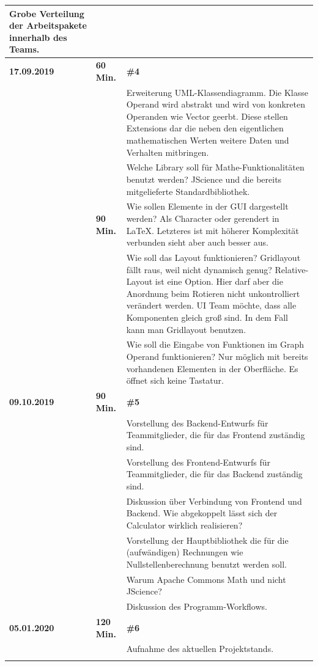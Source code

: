 {\begin{longtable}{|l|l|p{11cm}|}
			Grobe Verteilung der Arbeitspakete innerhalb des Teams.
	\\\hline
		\textbf{17.09.2019} & \textbf{ 60 Min.} &
			\textbf{\#4}
			\\ & &
			Erweiterung UML-Klassendiagramm. Die Klasse Operand wird abstrakt und wird von konkreten Operanden wie Vector geerbt. Diese stellen Extensions dar die neben den eigentlichen mathematischen Werten weitere Daten und Verhalten mitbringen.
			\\ & &
			Welche Library soll für Mathe-Funktionalitäten benutzt werden? JScience und die bereits mitgelieferte Standardbibliothek.
	\\\hline
		& \textbf{90 Min.} &
			Wie sollen Elemente in der GUI dargestellt werden? Als Character oder gerendert in LaTeX. Letzteres ist mit höherer Komplexität verbunden sieht aber auch besser aus. 
			\\ & &
			Wie soll das Layout funktionieren? Gridlayout fällt raus, weil nicht dynamisch genug? Relative-Layout ist eine Option. Hier darf aber die Anordnung beim Rotieren nicht unkontrolliert verändert werden. UI Team möchte, dass alle Komponenten gleich groß sind. In dem Fall kann man Gridlayout benutzen.
			\\ & &
			Wie soll die Eingabe von Funktionen im Graph Operand funktionieren? Nur möglich mit bereits vorhandenen Elementen in der Oberfläche. Es öffnet sich keine Tastatur.
	\\\hline
		\textbf{09.10.2019} & \textbf{90 Min.} &
			\textbf{\#5}
			\\ & &
			Vorstellung des Backend-Entwurfs für Teammitglieder, die für das Frontend zuständig sind.
			\\ & &
			Vorstellung des Frontend-Entwurfs für Teammitglieder, die für das Backend zuständig sind.
			\\ & &
			Diskussion über Verbindung von Frontend und Backend. Wie abgekoppelt lässt sich der Calculator wirklich realisieren?
			\\ & &
			Vorstellung der Hauptbibliothek die für die (aufwändigen) Rechnungen wie Nullstellenberechnung benutzt werden soll.
			\\ & &
			Warum Apache Commons Math und nicht JScience?
			\\ & &
			Diskussion des Programm-Workflows.
	\\ \hline
		\textbf{05.01.2020} & \textbf{120 Min.} &
			\textbf{\#6}
			\\ & &
			Aufnahme des aktuellen Projektstands.
			\\ & &

\end{longtable}}
